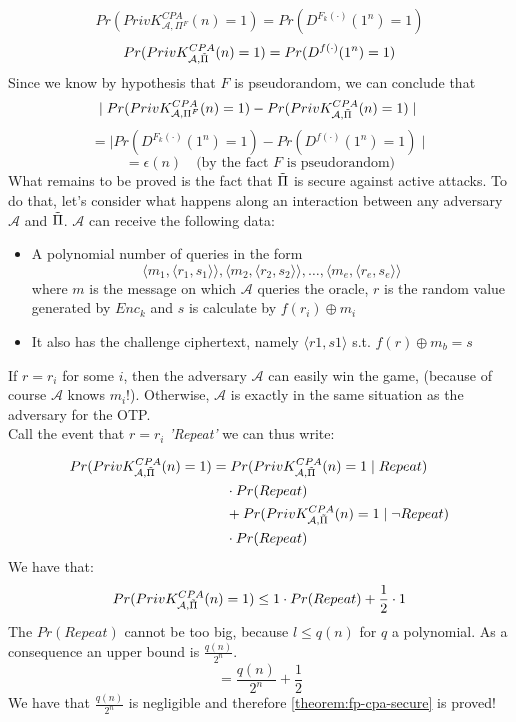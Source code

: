 \documentclass[../main]{subfiles}
\begin{document}
$$Pr(PrivK^{CPA}_{\mathcal{A}, \Pi{}^F}(n) = 1) = Pr(D^{F_k(\cdot{})}(1^n) = 1)$$
$$Pr(PrivK^{CPA}_{\mathcal{A}, \Tilde{\Pi{}}}(n) = 1) = Pr(D^{f(\cdot{})}(1^n) = 1)$$
\newpage
Since we know by hypothesis that $F$ is pseudorandom, we can conclude that $$\mid{} Pr(PrivK^{CPA}_{\mathcal{A}, \Pi{}^F}(n) = 1) - Pr(PrivK^{CPA}_{\mathcal{A}, \Tilde{\Pi{}}}(n) = 1) \mid{}$$
$$= \mid{} Pr(D^{F_k(\cdot{})}(1^n) = 1) - Pr(D^{f(\cdot{})}(1^n) = 1) \mid{}$$
$$= \epsilon(n) \quad \text{(by the fact $F$ is pseudorandom)}$$
What remains to be proved is the fact that $\Tilde{\Pi{}}$ is secure against active attacks.
To do that, let's consider what happens along an interaction between any adversary $\mathcal{A}$ and $\Tilde{\Pi{}}$. $\mathcal{A}$ can receive the following data:
\begin{itemize}
    \item A polynomial number of queries in the form $$\langle{} m_1, \langle{} r_1, s_1 \rangle{} \rangle{}, \langle{} m_2, \langle{} r_2, s_2 \rangle{} \rangle{}, \ldots{}, \langle{} m_e, \langle{} r_e, s_e \rangle{} \rangle{}$$ where $m$ is the message on which $\mathcal{A}$ queries the oracle, $r$ is the random value generated by $Enc_k$ and $s$ is calculate by $f(r_i) \oplus{} m_i$
    \item It also has the challenge ciphertext, namely $\langle{} r1, s1 \rangle{}$ s.t. $f(r) \oplus{} m_b = s$
\end{itemize}
If $r=r_i$ for some $i$, then the adversary $\mathcal{A}$ can easily win the game, (because of course $\mathcal{A}$ knows $m_i$!).
Otherwise, $\mathcal{A}$ is exactly in the same situation as the adversary for the OTP.\\
Call the event that $r=r_i$ \textit{'Repeat'} we can thus write:

\begin{equation*}
    \begin{split}
        Pr(PrivK^{CPA}_{\mathcal{A}, \Tilde{\Pi{}}}(n) = 1) &= Pr(PrivK^{CPA}_{\mathcal{A}, \Tilde{\Pi{}}}(n) = 1 \mid{} Repeat)\\
        &\quad{} \cdot{} Pr(Repeat) \\
        &\quad{} + Pr(PrivK^{CPA}_{\mathcal{A}, \Tilde{\Pi{}}}(n) = 1 \mid{} \neg{} Repeat) \\
        &\quad{} \cdot{} Pr(Repeat)
    \end{split}
\end{equation*}
\noindent
We have that:
$$Pr(PrivK^{CPA}_{\mathcal{A}, \Tilde{\Pi{}}}(n) = 1) \leq{} 1 \cdot{} Pr(Repeat) + \frac{1}{2} \cdot{} 1 $$
The $Pr(Repeat)$ cannot be too big, because $\mathbb{}{l} \leq{} q(n)$ for $q$ a polynomial. As a consequence an upper bound is $\frac{q(n)}{2^n}$.
$$= \frac{q(n)}{2^n} + \frac{1}{2}$$
We have that $ \frac{q(n)}{2^n} $ is negligible and therefore \ref{theorem:fp-cpa-secure} is proved!
\end{document}
